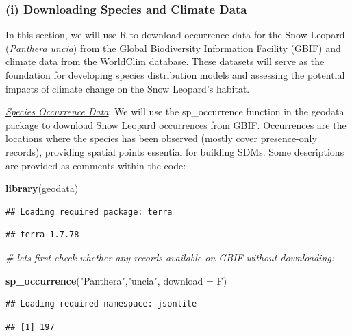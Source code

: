 \documentclass[
]{article}
\newenvironment{Shaded}{\begin{snugshade}}{\end{snugshade}}
\newcommand{\AttributeTok}[1]{\textcolor[rgb]{0.13,0.29,0.53}{#1}}
\newcommand{\CommentTok}[1]{\textcolor[rgb]{0.56,0.35,0.01}{\textit{#1}}}
\newcommand{\FunctionTok}[1]{\textcolor[rgb]{0.13,0.29,0.53}{\textbf{#1}}}
\newcommand{\NormalTok}[1]{#1}
\newcommand{\StringTok}[1]{\textcolor[rgb]{0.31,0.60,0.02}{#1}}
\begin{document}
\subsubsection{(i) Downloading Species and Climate
Data}\label{i-downloading-species-and-climate-data}

In this section, we will use R to download occurrence data for the Snow
Leopard (\textit{Panthera uncia}) from the Global Biodiversity
Information Facility (GBIF) and climate data from the WorldClim
database. These datasets will serve as the foundation for developing
species distribution models and assessing the potential impacts of
climate change on the Snow Leopard's habitat.

\uline{\textit{Species Occurrence Data}}: We will use the sp\_occurrence
function in the geodata package to download Snow Leopard occurrences
from GBIF. Occurrences are the locations where the species has been
observed (mostly cover presence-only records), providing spatial points
essential for building SDMs. Some descriptions are provided as comments
within the code:

\begin{Shaded}
\begin{Highlighting}[]
\FunctionTok{library}\NormalTok{(geodata)}
\end{Highlighting}
\end{Shaded}

\begin{verbatim}
## Loading required package: terra
\end{verbatim}

\begin{verbatim}
## terra 1.7.78
\end{verbatim}

\begin{Shaded}
\begin{Highlighting}[]
\CommentTok{\# let\textquotesingle{}s first check whether any records available on GBIF without downloading:}

\FunctionTok{sp\_occurrence}\NormalTok{(}\StringTok{"Panthera"}\NormalTok{,}\StringTok{"uncia"}\NormalTok{, }\AttributeTok{download =}\NormalTok{ F)}
\end{Highlighting}
\end{Shaded}

\begin{verbatim}
## Loading required namespace: jsonlite
\end{verbatim}

\begin{verbatim}
## [1] 197
\end{verbatim}
\end{document}
